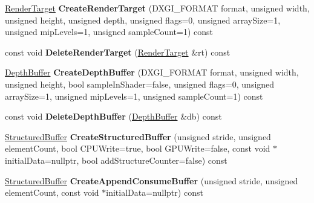 \begin{DoxyCompactItemize}
\item 
\hyperlink{struct_ensum_1_1_graphics_1_1_render_target}{Render\+Target} {\bfseries Create\+Render\+Target} (D\+X\+G\+I\+\_\+\+F\+O\+R\+M\+AT format, unsigned width, unsigned height, unsigned depth, unsigned flags=0, unsigned array\+Size=1, unsigned mip\+Levels=1, unsigned sample\+Count=1) const \hypertarget{class_ensum_1_1_graphics_1_1_direct3_d11_a1f485443b98ca65ad7cf3a4e7fe8ab01}{}\label{class_ensum_1_1_graphics_1_1_direct3_d11_a1f485443b98ca65ad7cf3a4e7fe8ab01}

\item 
const void {\bfseries Delete\+Render\+Target} (\hyperlink{struct_ensum_1_1_graphics_1_1_render_target}{Render\+Target} \&rt) const \hypertarget{class_ensum_1_1_graphics_1_1_direct3_d11_ae92708638a582ef8f9c1b3365cb13c15}{}\label{class_ensum_1_1_graphics_1_1_direct3_d11_ae92708638a582ef8f9c1b3365cb13c15}

\item 
\hyperlink{struct_ensum_1_1_graphics_1_1_depth_buffer}{Depth\+Buffer} {\bfseries Create\+Depth\+Buffer} (D\+X\+G\+I\+\_\+\+F\+O\+R\+M\+AT format, unsigned width, unsigned height, bool sample\+In\+Shader=false, unsigned flags=0, unsigned array\+Size=1, unsigned mip\+Levels=1, unsigned sample\+Count=1) const \hypertarget{class_ensum_1_1_graphics_1_1_direct3_d11_a92b2f778d29d893b02d2340b5f5fd601}{}\label{class_ensum_1_1_graphics_1_1_direct3_d11_a92b2f778d29d893b02d2340b5f5fd601}

\item 
const void {\bfseries Delete\+Depth\+Buffer} (\hyperlink{struct_ensum_1_1_graphics_1_1_depth_buffer}{Depth\+Buffer} \&db) const \hypertarget{class_ensum_1_1_graphics_1_1_direct3_d11_a59404f3cb164d6f4090fb08ed807a8ba}{}\label{class_ensum_1_1_graphics_1_1_direct3_d11_a59404f3cb164d6f4090fb08ed807a8ba}

\item 
\hyperlink{struct_ensum_1_1_graphics_1_1_structured_buffer}{Structured\+Buffer} {\bfseries Create\+Structured\+Buffer} (unsigned stride, unsigned element\+Count, bool C\+P\+U\+Write=true, bool G\+P\+U\+Write=false, const void $\ast$initial\+Data=nullptr, bool add\+Structure\+Counter=false) const \hypertarget{class_ensum_1_1_graphics_1_1_direct3_d11_a817c74a8413dc1786d08c1d9ed8a214d}{}\label{class_ensum_1_1_graphics_1_1_direct3_d11_a817c74a8413dc1786d08c1d9ed8a214d}

\item 
\hyperlink{struct_ensum_1_1_graphics_1_1_structured_buffer}{Structured\+Buffer} {\bfseries Create\+Append\+Consume\+Buffer} (unsigned stride, unsigned element\+Count, const void $\ast$initial\+Data=nullptr) const \hypertarget{class_ensum_1_1_graphics_1_1_direct3_d11_a56d338dff88648277a5f49882b6af286}{}\label{class_ensum_1_1_graphics_1_1_direct3_d11_a56d338dff88648277a5f49882b6af286}


\end{DoxyCompactItemize}
